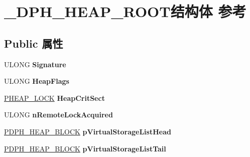 \hypertarget{struct___d_p_h___h_e_a_p___r_o_o_t}{}\section{\+\_\+\+D\+P\+H\+\_\+\+H\+E\+A\+P\+\_\+\+R\+O\+O\+T结构体 参考}
\label{struct___d_p_h___h_e_a_p___r_o_o_t}
\subsection*{Public 属性}
\begin{DoxyCompactItemize}
\item 
\mbox{\label{struct___d_p_h___h_e_a_p___r_o_o_t_a7eb478b7b11ecb6a894168f097788532}} 
U\+L\+O\+NG {\bfseries Signature}
\item 
\mbox{\label{struct___d_p_h___h_e_a_p___r_o_o_t_ab83fc1ab685f1831f5274be92aba9628}} 
U\+L\+O\+NG {\bfseries Heap\+Flags}
\item 
\mbox{\label{struct___d_p_h___h_e_a_p___r_o_o_t_a2a1f0b2af8790fd34ffb6a2dd354c471}} 
\hyperlink{struct___h_e_a_p___l_o_c_k}{P\+H\+E\+A\+P\+\_\+\+L\+O\+CK} {\bfseries Heap\+Crit\+Sect}
\item 
\mbox{\label{struct___d_p_h___h_e_a_p___r_o_o_t_a983b02a7013e00d26edef6e63c9be8bb}} 
U\+L\+O\+NG {\bfseries n\+Remote\+Lock\+Acquired}
\item 
\mbox{\label{struct___d_p_h___h_e_a_p___r_o_o_t_a5dc6e5601033855bfbb588046d86b25f}} 
\hyperlink{struct___d_p_h___h_e_a_p___b_l_o_c_k}{P\+D\+P\+H\+\_\+\+H\+E\+A\+P\+\_\+\+B\+L\+O\+CK} {\bfseries p\+Virtual\+Storage\+List\+Head}
\item 
\mbox{\label{struct___d_p_h___h_e_a_p___r_o_o_t_a167189a1c431868d4d9eebec9f21b494}} 
\hyperlink{struct___d_p_h___h_e_a_p___b_l_o_c_k}{P\+D\+P\+H\+\_\+\+H\+E\+A\+P\+\_\+\+B\+L\+O\+CK} {\bfseries p\+Virtual\+Storage\+List\+Tail}
\item 
\mbox{\label{struct___d_p_h___h_e_a_p___r_o_o_t_a781bdb8bf9a2264d0b1e5afe7dddc956}} 

\end{DoxyCompactItemize}
